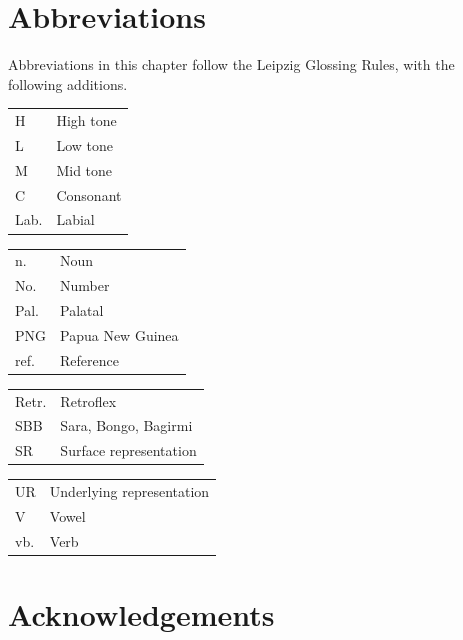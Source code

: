 \documentclass[output=paper,colorlinks,citecolor=brown
]{langscibook}
\begin{document}
\section*{Abbreviations}

Abbreviations in this chapter follow the Leipzig Glossing Rules, with the following additions.\medskip

\begin{tabularx}{.45\textwidth}{lQ}
 H  &  High tone                         \\
 L  &  Low tone                          \\
 M  &  Mid tone                          \\
 C  &  Consonant                         \\
 Lab.  &  Labial                         \\
 \end{tabularx}
\begin{tabularx}{.45\textwidth}{lQ}
 n.  &  Noun                             \\
 No.  &  Number                          \\
 Pal.  &  Palatal                        \\
 PNG  &  Papua New Guinea                \\
 ref.  &  Reference                      \\
 \end{tabularx}

\begin{tabularx}{.45\textwidth}{lQ}
 Retr.  &  Retroflex                     \\
 SBB  &  Sara, Bongo,  Bagirmi          \\
 SR  &  Surface representation           \\
 \end{tabularx}
\begin{tabularx}{.45\textwidth}{lQ}
 UR  &  Underlying representation        \\
 V  &  Vowel                             \\
 vb.  &  Verb                            \\
 \end{tabularx}


\section*{Acknowledgements}
\end{document}
